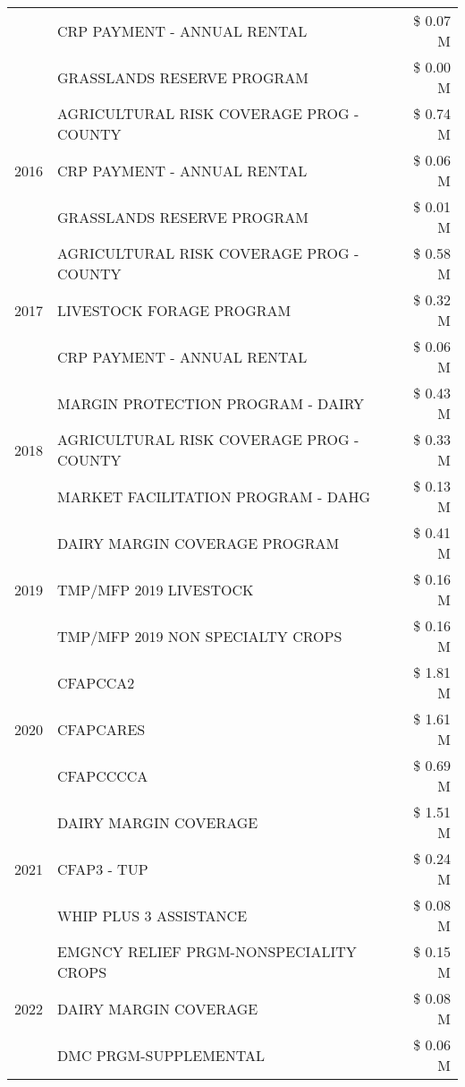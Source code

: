\begin{tabular}{llr}
 & CRP PAYMENT - ANNUAL RENTAL & \$ 0.07 M \\
 & GRASSLANDS RESERVE PROGRAM & \$ 0.00 M \\
\cline{1-3}
\multirow[t]{3}{*}{2016} & AGRICULTURAL RISK COVERAGE PROG - COUNTY & \$ 0.74 M \\
 & CRP PAYMENT - ANNUAL RENTAL & \$ 0.06 M \\
 & GRASSLANDS RESERVE PROGRAM & \$ 0.01 M \\
\cline{1-3}
\multirow[t]{3}{*}{2017} & AGRICULTURAL RISK COVERAGE PROG - COUNTY & \$ 0.58 M \\
 & LIVESTOCK FORAGE PROGRAM & \$ 0.32 M \\
 & CRP PAYMENT - ANNUAL RENTAL & \$ 0.06 M \\
\cline{1-3}
\multirow[t]{3}{*}{2018} & MARGIN PROTECTION PROGRAM - DAIRY & \$ 0.43 M \\
 & AGRICULTURAL RISK COVERAGE PROG - COUNTY & \$ 0.33 M \\
 & MARKET FACILITATION PROGRAM - DAHG & \$ 0.13 M \\
\cline{1-3}
\multirow[t]{3}{*}{2019} & DAIRY MARGIN COVERAGE PROGRAM & \$ 0.41 M \\
 & TMP/MFP 2019 LIVESTOCK & \$ 0.16 M \\
 & TMP/MFP 2019 NON SPECIALTY CROPS & \$ 0.16 M \\
\cline{1-3}
\multirow[t]{3}{*}{2020} & CFAPCCA2 & \$ 1.81 M \\
 & CFAPCARES & \$ 1.61 M \\
 & CFAPCCCCA & \$ 0.69 M \\
\cline{1-3}
\multirow[t]{3}{*}{2021} & DAIRY MARGIN COVERAGE & \$ 1.51 M \\
 & CFAP3 - TUP & \$ 0.24 M \\
 & WHIP PLUS 3 ASSISTANCE & \$ 0.08 M \\
\cline{1-3}
\multirow[t]{3}{*}{2022} & EMGNCY RELIEF PRGM-NONSPECIALITY CROPS & \$ 0.15 M \\
 & DAIRY MARGIN COVERAGE & \$ 0.08 M \\
 & DMC PRGM-SUPPLEMENTAL & \$ 0.06 M \\
\cline{1-3}
\bottomrule
\end{tabular}
